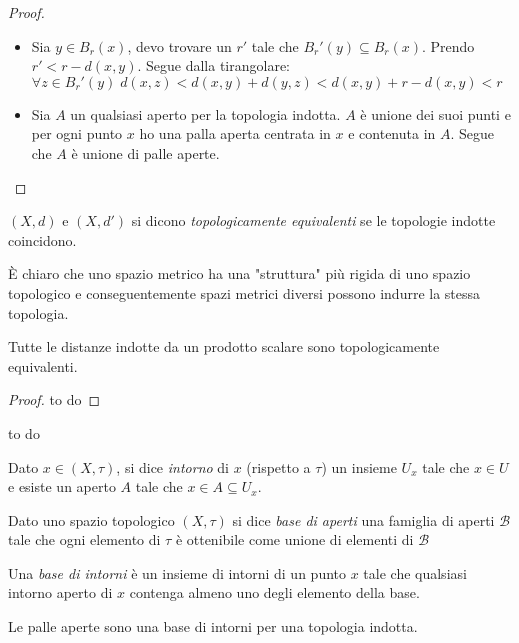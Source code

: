 \begin{proof}\noindent
\begin{itemize}
\item Sia $y \in B_r(x)$, devo trovare un $r'$ tale che $B_r'(y) \subseteq B_r(x)$. Prendo $r' < r-d(x,y)$. Segue dalla tirangolare:\\ $\forall z \in B_r'(y)\; d(x,z) < d(x,y) + d(y,z) < d(x,y)  + r - d(x,y) < r$
\item Sia $A$ un qualsiasi aperto per la topologia indotta. $A$ è unione dei suoi punti e per ogni punto $x$ ho una palla aperta centrata in $x$ e contenuta in $A$. Segue che $A$ è unione di palle aperte.
\end{itemize}
\end{proof}

\begin{defn}
$(X,d)$ e $(X,d')$ si dicono \textit{topologicamente equivalenti} se le topologie indotte coincidono.
\end{defn}

\begin{oss}
È chiaro che uno spazio metrico ha una "struttura" più rigida di uno spazio topologico e conseguentemente spazi metrici diversi possono indurre la stessa topologia.
\end{oss}

\begin{teo}
Tutte le distanze indotte da un prodotto scalare sono topologicamente equivalenti.
\end{teo}

\begin{proof}
to do
\end{proof}

\begin{es}
to do
\end{es}

\begin{defn}[Intorno]
Dato $x \in (X,\tau)$, si dice \textit{intorno} di $x$ (rispetto a $\tau$) un insieme $U_x$ tale che $x \in U$  e esiste un aperto $A$ tale che $x \in A \subseteq U_x$.
\end{defn}

\begin{defn}
Dato uno spazio topologico $(X,\tau)$ si dice \textit{base di aperti} una famiglia di aperti $\mathcal B$ tale che ogni elemento di $\tau$ è ottenibile come unione di elementi di $\mathcal B$
\end{defn}

\begin{defn}
Una \textit{base di intorni} è un insieme di intorni di un punto $x$ tale che qualsiasi intorno aperto di $x$ contenga almeno uno degli elemento della base.
\end{defn}

\begin{oss}
Le palle aperte sono una base di intorni per una topologia indotta.
\end{oss}